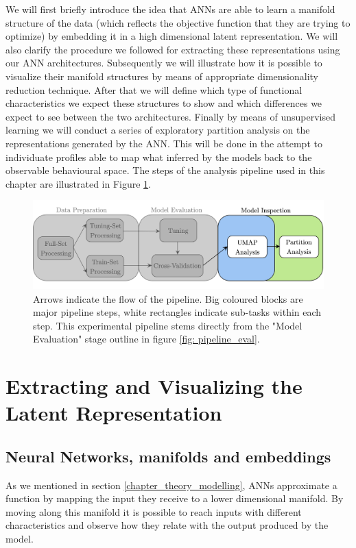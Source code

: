 We will first briefly introduce the idea that ANNs are able to learn a manifold structure of the data (which reflects the objective function that they are trying to optimize) by embedding it in a high dimensional latent representation. We will also clarify the procedure we followed for extracting these representations using our ANN architectures. Subsequently we will illustrate how it is possible to visualize their manifold structures by means of appropriate dimensionality reduction technique.  After that we will define which type of functional characteristics we expect these structures to show  and which differences we expect to see between the two architectures. Finally by means of unsupervised learning we will conduct a series of exploratory partition analysis on the representations generated by the ANN. This will be done in the attempt to individuate profiles able to map what inferred by the models back to the observable behavioural space. The steps of the analysis pipeline used in this chapter are illustrated in Figure \ref{fig: pipeline_inspect}.
\begin{figure}[!htb]
  \centering
  \includegraphics[width=\textwidth]{images/chapter_4/pipeline_inspect.png}
    \caption[\textbf{Representation analysis experimental pipeline}]{Arrows indicate the flow of the pipeline. Big coloured blocks are major pipeline steps, white rectangles indicate sub-tasks within each step. This experimental pipeline stems directly from the "Model Evaluation" stage outline in figure \ref{fig: pipeline_eval}.}
    \label{fig: pipeline_inspect}
\end{figure}

\section{Extracting and Visualizing the Latent Representation}
\label{extract_visulize}

\subsection{Neural Networks, manifolds and embeddings}
\label{manifold_learning_embed}
As we mentioned in section \ref{chapter_theory_modelling}, ANNs approximate a function by mapping the input they receive to a lower dimensional manifold. By moving along this manifold it is possible to reach inputs with different characteristics and observe how they relate with the output produced by the model.

